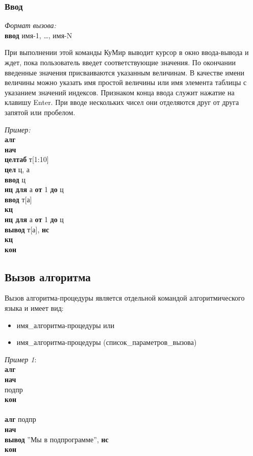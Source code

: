 \subsubsection{Ввод}

\emph{Формат вызова:}\\
\textsf{\textbf{ввод} имя-1, \dots, имя-N}

При выполнении этой команды КуМир выводит курсор в окно ввода-вывода и ждет, пока пользователь введет соответствующие значения. По окончании введенные значения присваиваются указанным величинам. В качестве имени величины можно указать имя  простой величины или имя элемента таблицы с указанием значений индексов. Признаком конца ввода служит нажатие на клавишу Enter. При вводе нескольких чисел они отделяются друг от друга запятой или пробелом. 

\emph{Пример:}\\
{\sffamily
\textbf{алг}\\
\textbf{нач}\\
\otstup \textbf{целтаб} т[1:10]\\
\otstup \textbf{цел} ц, а\\
\otstup \textbf{ввод} ц\\
\otstup \textbf{нц для} а \textbf{от} 1 \textbf{до} ц\\
\otstup \otstup \textbf{ввод} т[а]\\
\otstup \textbf{кц}\\
\otstup \textbf{нц для} а \textbf{от} 1 \textbf{до} ц\\
\otstup \otstup \textbf{вывод} т[а], \textbf{нс}\\
\otstup \textbf{кц}\\
\textbf{кон}
}

\subsection{Вызов алгоритма}
\label{algcalling}

Вызов алгоритма-процедуры является отдельной командой алгоритмического языка и имеет вид:
\begin{itemize}
\item \textsf{имя\_алгоритма-процедуры} или
\item \textsf{имя\_алгоритма-процедуры (список\_параметров\_вызова)}
\end{itemize}

\emph{Пример 1}:\\
{\sffamily
\textbf{алг}\\
\textbf{нач}\\
\otstup подпр\\
\textbf{кон}\\
~\\
\textbf{алг} подпр\\
\textbf{нач}\\
\otstup \textbf{вывод} ''Мы в подпрограмме'', \textbf{нс}\\
\textbf{кон}
}

